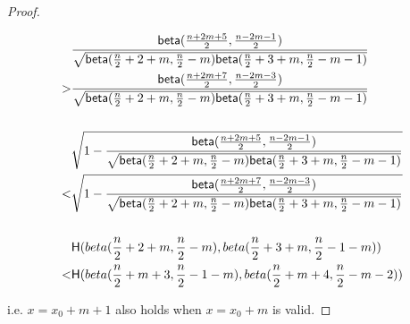 \documentclass{article}
\begin{document}
\begin{proof}
\begin{footnotesize}
\begin{equation*}
\begin{split}
& \frac{\mathsf{beta}(\frac{n + 2m + 5}{2}, \frac{n - 2m - 1}{2})}
{\sqrt{
\mathsf{beta}(\frac{n}{2} + 2 + m, \frac{n}{2} - m)
\mathsf{beta}(\frac{n}{2} + 3 + m, \frac{n}{2} - m - 1)
}
}\\
> & \frac{\mathsf{beta}(\frac{n + 2m + 7}{2}, \frac{n - 2m - 3}{2})}
{\sqrt{
\mathsf{beta}(\frac{n}{2} + 2 + m, \frac{n}{2} - m)
\mathsf{beta}(\frac{n}{2} + 3 + m, \frac{n}{2} - m - 1)
}
}\\
\\
& \sqrt{1 - \frac{\mathsf{beta}(\frac{n + 2m + 5}{2}, \frac{n - 2m - 1}{2})}
{\sqrt{
\mathsf{beta}(\frac{n}{2} + 2 + m, \frac{n}{2} - m)
\mathsf{beta}(\frac{n}{2} + 3 + m, \frac{n}{2} - m - 1)
}
}}\\
< & \sqrt{1 - \frac{\mathsf{beta}(\frac{n + 2m + 7}{2}, \frac{n - 2m - 3}{2})}
{\sqrt{
\mathsf{beta}(\frac{n}{2} + 2 + m, \frac{n}{2} - m)
\mathsf{beta}(\frac{n}{2} + 3 + m, \frac{n}{2} - m - 1)
}
}}\\
\\
& \mathsf{H}(beta(\frac{n}{2} + 2 + m, \frac{n}{2} - m), beta(\frac{n}{2} + 3 + m, \frac{n}{2} - 1 - m))\\
< & \mathsf{H}(beta(\frac{n}{2} + m + 3, \frac{n}{2} - 1 - m), beta(\frac{n}{2} + m + 4, \frac{n}{2} - m - 2))\\
\end{split}
\end{equation*}
\end{footnotesize}

i.e. $ x = x_0 + m + 1$ also holds when $x = x_0 + m$ is valid.
\end{proof}
\end{document}

